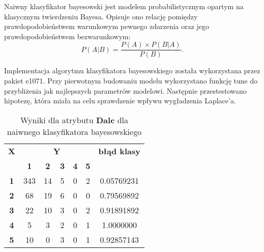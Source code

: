 
Naiwny klasyfikator bayesowski jest modelem probabilistycznym opartym na klasycznym twierdzeniu Bayesa. Opisuje ono relację pomiędzy prawdopodobieństwem warunkowym pewnego zdarzenia oraz jego prawdopodobieństwem bezwarunkowym:
\begin{equation}
\label{eq:bayes}
    P(A|B) = \frac{P(A)\times P(B|A)}{P(B)}.
\end{equation}



Implementacja algorytmu klasyfikatora bayesowskiego została wykorzystana przez pakiet e1071. Przy pierwotnym budowaniu modelu wykorzystano funkcję tune do przybliżenia jak najlepszych parametrów modelowi. Następnie przestestowano hipotezę, która miała na celu sprawdzenie wpływu wygładzenia Laplace'a.

\begin{table}[h]
\caption{Wyniki dla atrybutu \textbf{Dalc} dla naiwnego klasyfikatora bayesowskiego}
\centering
\begin{tabular}{|c|c|c|c|c|c|c|}
\hline
\multirow{}{}{\textbf{X}} & \multicolumn{5}{c|}{\textbf{Y}}                                & \multirow{}{}{\textbf{błąd klasy}} \\ \cline{2-6}
                            & \textbf{1} & \textbf{2} & \textbf{3} & \textbf{4} & \textbf{5} &                                      \\ \hline
\textbf{1}                  & 343        & 14         & 5          & 0          & 2          & 0.05769231                           \\ \hline
\textbf{2}                  & 68         & 19         & 6          & 0          & 0          & 0.79569892                           \\ \hline
\textbf{3}                  & 22         & 10         & 3          & 0          & 2          & 0.91891892                           \\ \hline
\textbf{4}                  & 5          & 3          & 2          & 0          & 1          & 1.0000000                            \\ \hline
\textbf{5}                  & 10         & 0          & 3          & 0          & 1          & 0.92857143                           \\ \hline
\end{tabular}
\end{table}

